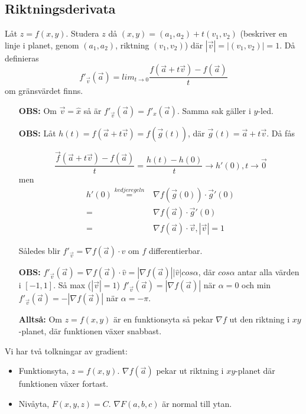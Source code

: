 \documentclass[a4paper,12pt]{article}
\begin{document}
\subsection{Riktningsderivata}
Låt $z = f(x,y)$. Studera $z$ då $(x,y) = (a_1,a_2)+t(v_1,v_2)$ (beskriver en
linje i planet, genom $(a_1,a_2)$, riktning $(v_1, v_2)$) där
$|\vec{v}| = |(v_1, v_2)| = 1$. Då definieras
\begin{equation*}
  f'_{\vec{v}}(\vec{a}) =
  lim_{t \to 0}\frac{f(\vec{a}+t\vec{v})-f(\vec{a})}{t}
\end{equation*} om gränsvärdet finns.

\begin{itemize}
\item[\textbf{OBS:}] 
  Om $\vec{v} = \hat{x}$ så är $f'_{\vec{v}}(\vec{a}) = f'_x(\vec{a})$. Samma
  sak gäller i $y$-led.
\item[\textbf{OBS:}]
  Låt $h(t) = f(\vec{a}+t\vec{v}) = f(\vec{g}(t))$, där
  $\vec{g}(t)=\vec{a}+t\vec{v}$. Då fås

  \begin{equation*}
    \frac{\vec{f}(\vec{a}+t\vec{v})-f(\vec{a})}{t} = \frac{h(t)-h(0)}{t}
    \to h'(0), t \to \vec{0}
  \end{equation*}
  men
  \begin{align*}
    h'(0) \stackrel{kedjeregeln}{= } & \nabla f(\vec{g}(0)) \cdot \vec{g}'(0) \\
    = & \nabla f(\vec{a}) \cdot \vec{g}'(0) \\
    = & \nabla f(\vec{a}) \cdot \vec{v}, |\vec{v}|=1
  \end{align*}

  Således blir $f'_{\vec{v}} = \nabla f(\vec{a})\cdot \hat{v}$ om $f$
  differentierbar.
\item[\textbf{OBS:}]
  $f'_{\vec{v}}(\vec{a})=\nabla f(\vec{a}) \cdot \hat{v} =
  |\nabla f(\vec{a})||\hat{v}|cos\alpha$, där $cos\alpha$ antar alla värden i
  $[-1,1]$. Så max ($|\vec{v}|=1$) $f'_{\vec{v}}(\vec{a})=|\nabla f(\vec{a})|$
  när $\alpha = 0$ och min $f'_{\vec{v}}(\vec{a})=-|\nabla f(\vec{a})|$ när
  $\alpha = -\pi$.
\item[\textbf{Alltså:}]
  Om $z=f(x,y)$ är en funktionsyta så pekar $\nabla f$ ut den riktning i
  $xy$-planet, där funktionen växer snabbast.
\end{itemize}

Vi har två tolkningar av gradient:
\begin{itemize}
\item Funktionsyta, $z = f(x,y)$. $\nabla f(\vec{a})$ pekar ut riktning i
  $xy$-planet där funktionen växer fortast.
\item Nivåyta, $F(x,y,z)=C$. $\nabla F(a,b,c)$ är normal till ytan.
\end{itemize}
\end{document}
